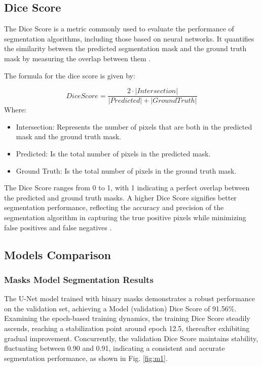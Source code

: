\documentclass[runningheads]{llncs}
\begin{document}
\subsection{Dice Score}
The Dice Score is a metric commonly used to evaluate the performance of segmentation algorithms, including those based on neural networks. It quantifies the similarity between the predicted segmentation mask and the ground truth mask by measuring the overlap between them \cite{dice}.

The formula for the dice score is given by:

\begin{equation}
DiceScore = \frac{2 \cdot \left | Intersection \right |}{\left | Predicted \right |+\left | GroundTruth \right |}
\end{equation}
Where:
\begin{itemize}
    \item Intersection: Represents the number of pixels that are both in the predicted mask and the ground truth mask.
    \item Predicted: Is the total number of pixels in the predicted mask.
    \item Ground Truth: Is the total number of pixels in the ground truth mask.
\end{itemize}

The Dice Score ranges from 0 to 1, with 1 indicating a perfect overlap between the predicted and ground truth masks. A higher Dice Score signifies better segmentation performance, reflecting the accuracy and precision of the segmentation algorithm in capturing the true positive pixels while minimizing false positives and false negatives \cite{dice}.

\subsection{Models Comparison}

\subsubsection{Masks Model Segmentation Results}
The U-Net model trained with binary masks demonstrates a robust performance on the validation set, achieving a Model (validation) Dice Score of 91.56\%. Examining the epoch-based training dynamics, the training Dice Score steadily ascends, reaching a stabilization point around epoch 12.5, thereafter exhibiting gradual improvement. Concurrently, the validation Dice Score maintains stability, fluctuating between 0.90 and 0.91, indicating a consistent and accurate segmentation performance, as shown in Fig. \ref{fig:m1}.
\end{document}
